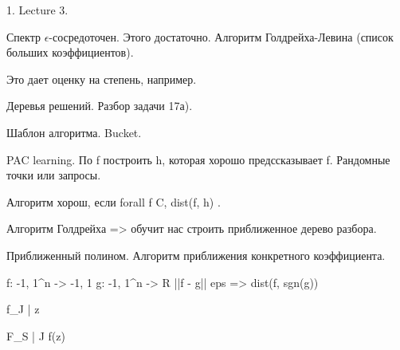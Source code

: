 1. Lecture 3.

Спектр $\epsilon$-сосредоточен. Этого достаточно. Алгоритм Голдрейха-Левина (список больших коэффициентов).

Это дает оценку на степень, например.

Деревья решений. Разбор задачи 17а).


Шаблон алгоритма. Bucket.


PAC learning. По f построить h, которая хорошо предссказывает f.
Рандомные точки или запросы.

Алгоритм хорош, если forall f \in C, dist(f, h) \le \epsilon.

Алгоритм Голдрейха => обучит нас строить приближенное дерево разбора.



Приближенный полином. Алгоритм приближения конкретного коэффициента.

f: {-1, 1}^n -> {-1, 1}
g: {-1, 1}^n -> R
||f - g|| \le eps => dist(f, sgn(g))


f_{J | z}

F_{S | J} f(z)

